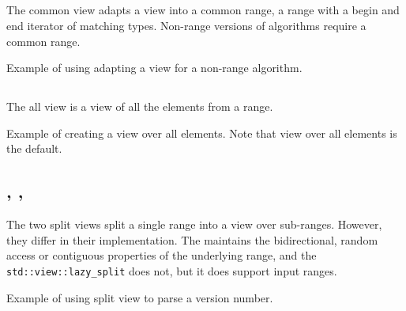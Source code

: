 \subsection{\texorpdfstring{}{\texttt{std::views::common}}}

The common view adapts a view into a common range, a range with a begin and end iterator of matching types. Non-range versions of algorithms require a common range.

\begin{box-note}
\footnotesize Example of using adapting a view for a non-range algorithm.
\tcblower
{}
\end{box-note}

\subsection{\texorpdfstring{}{\texttt{std::views::all}}}

The all view is a view of all the elements from a range.

\begin{box-note}
\footnotesize Example of creating a view over all elements. Note that view over all elements is the default.
\tcblower
{}
\end{box-note}

\subsection{\texorpdfstring{, , \newline{}}{\texttt{std::views::split}, \texttt{std::views::lazy\_split}, \textCR\texttt{std::views::join\_view}}}

The two split views split a single range into a view over sub-ranges. However, they differ in their implementation.
The  maintains the bidirectional, random access or contiguous properties of the underlying range, and the \texttt{std::view::\-lazy\_split} does not, but it does support input ranges.

\begin{box-note}
\footnotesize Example of using split view to parse a version number.
\tcblower
{}
\end{box-note}

